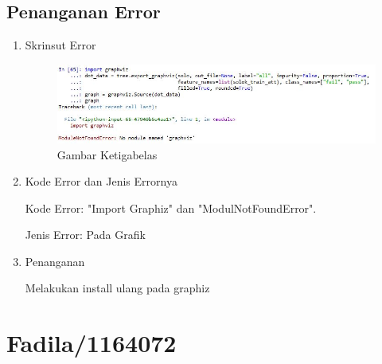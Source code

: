 \subsection{Penanganan Error}
\begin{enumerate}
\item Skrinsut Error
\begin{figure}[ht]
\centering
\includegraphics[scale=0.5]{figures/6.jpg}
\caption{ Gambar Ketigabelas}
\label{6}
\end{figure}
\item Kode Error dan Jenis Errornya
\par Kode Error: "Import Graphiz" dan "ModulNotFoundError". 
\par Jenis Error: Pada Grafik
\item Penanganan
\par Melakukan install ulang pada graphiz

\end{enumerate}




\par
\par
\par
\section{Fadila/1164072}
